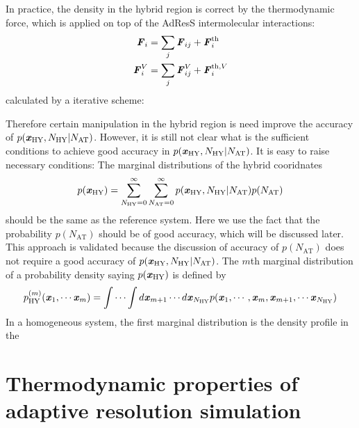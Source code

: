 \documentclass[epjST]{svjour}
\newcommand{\vect}[1]{\textbf{\textit{#1}}}
\newcommand{\AT}[0]{\textrm{AT}}
\newcommand{\HY}[0]{\textrm{HY}}
\newcommand{\moleidxone}[0]{i}
\newcommand{\moleidxtwo}[0]{j}
\newcommand{\thf}{{\textrm{th}}}
\begin{document}
In practice, the density in the hybrid region is correct by the
thermodynamic force, which is applied on top of the AdResS intermolecular interactions:
\begin{align}
  \vect F_\moleidxone &= \sum_\moleidxtwo \vect F_{\moleidxone\moleidxtwo}  + \vect F_\moleidxone^\thf  \\
  \vect F^V_\moleidxone &= \sum_\moleidxtwo \vect F^V_{\moleidxone\moleidxtwo} + \vect F_\moleidxone^{\thf,V}
\end{align}
calculated by a iterative scheme:

Therefore
certain manipulation in the hybrid region is need improve the accuracy
of $p(\vect x_\HY, N_\HY\vert N_\AT)$. However, it is still not clear
what is the sufficient conditions to achieve good accuracy in $p(\vect x_\HY, N_\HY\vert N_\AT)$.
It is easy to raise necessary conditions: The marginal distributions
of the hybrid cooridnates
\begin{align}
  p(\vect x_\HY) = \sum_{N_\HY = 0}^\infty \sum_{N_\AT = 0}^\infty p(\vect x_\HY, N_\HY\vert N_\AT) p(N_\AT)
\end{align}
should be the same as the reference system. Here we use the fact that
the probability $ p(N_\AT)$ should be of good accuracy, which will be
discussed later. This approach is validated because the discussion of
accuracy of $ p(N_\AT)$ does not require a good accuracy of $ p(\vect
x_\HY, N_\HY\vert N_\AT)$.  The $m$th marginal distribution of a probability density saying $p(\vect x_\HY)$ is defined
by
\begin{align}
  p_\HY^{(m)}(\vect x_1, \cdots \vect x_m) = \int\cdots\int d\vect x_{m+1}\cdots d\vect x_{N_\HY}
  p (\vect x_1, \cdots, \vect x_m, \vect x_{m+1}, \cdots \vect x_{N_\HY})
\end{align}
In a homogeneous system, the first marginal distribution is the
density profile in the


      



\section{Thermodynamic properties of adaptive resolution simulation}
\label{sec:thermodynamic}
\end{document}
